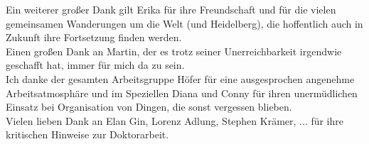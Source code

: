 Ein weiterer gro\ss{}er Dank gilt Erika f\"ur ihre Freundschaft und f\"ur die vielen gemeinsamen Wanderungen um die Welt (und Heidelberg), die hoffentlich auch in Zukunft ihre Fortsetzung finden werden.\\


Einen gro\ss{}en Dank an Martin, der es trotz seiner Unerreichbarkeit irgendwie geschafft hat, immer f\"{u}r mich da zu sein.\\

Ich danke der gesamten Arbeitsgruppe H\"{o}fer f\"{u}r eine ausgesprochen angenehme Arbeitsatmosph\"{a}re und im Speziellen Diana und Conny f\"ur ihren unerm\"{u}dlichen Einsatz bei Organisation von Dingen, die sonst vergessen blieben.\\

Vielen lieben Dank an Elan Gin, Lorenz Adlung, Stephen Kr\"{a}mer, ... f\"{u}r ihre kritischen Hinweise zur Doktorarbeit.    